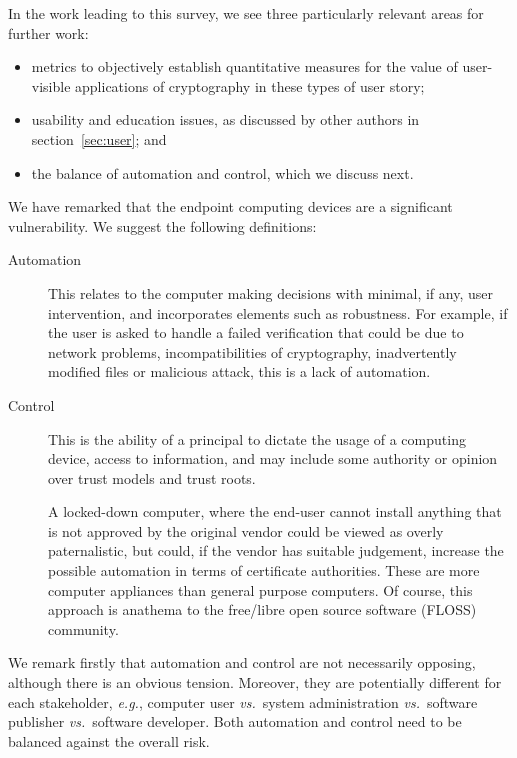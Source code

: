 \documentclass{article}
\newcommand{\eg}{\textit{e.g.}}
\newcommand{\vs}{\textit{vs.}}
\begin{document}
In the work leading to this survey, we see three particularly relevant areas for further work:
\begin{itemize}
\item metrics to objectively establish quantitative measures for the value of user-visible applications of cryptography in these types of user story;
\item usability and education issues, as discussed by other authors in section~\ref{sec:user}; and
\item the balance of automation and control, which we discuss next.
\end{itemize}

We have remarked that the endpoint computing devices are a significant
vulnerability.  We suggest the following definitions:
\begin{description}
\item[Automation] This relates to the computer making decisions with
  minimal, if any, user intervention, and incorporates elements such
  as robustness.  For example, if the user is asked to handle a failed
  verification that could be due to network problems,
  incompatibilities of cryptography, inadvertently modified files or
  malicious attack, this is a lack of automation.
\item[Control] This is the ability of a principal to dictate the usage
  of a computing device, access to information, and may include some
  authority or opinion over trust models and trust roots.  

  A locked-down computer, where the end-user cannot install anything
  that is not approved by the original vendor could be viewed as
  overly paternalistic, but could, if the vendor has suitable
  judgement, increase the possible automation in terms of certificate
  authorities.  These are more computer appliances  than general
  purpose computers.  Of course, this approach is anathema to the
  free/libre open source software (FLOSS) community.
\end{description}
We remark firstly that automation and control are not necessarily
opposing, although there is an obvious tension.  Moreover, they are
potentially different for each stakeholder, \eg, computer user \vs\
system administration \vs\ software publisher \vs\ software developer.
Both automation and control need to be balanced against the overall risk.
\end{document}
